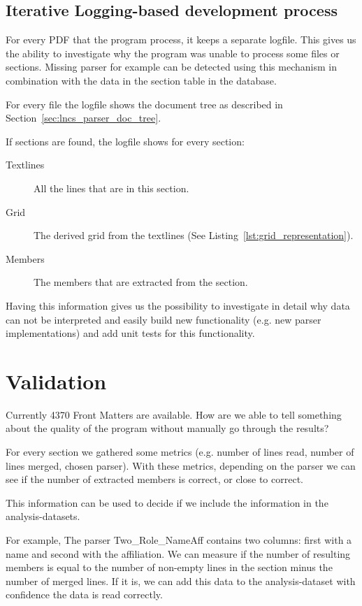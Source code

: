 \documentclass{ou-report}
\begin{document}
\subsection{Iterative Logging-based development process}
For every PDF that the program process, it keeps a separate logfile. This gives
us the ability to investigate why the program was unable to process some files 
or sections. Missing parser for example can be detected using this mechanism in
combination with the data in the section table in the database.

For every file the logfile shows the document tree as described in 
Section~\ref{sec:lncs_parser_doc_tree}. 

If sections are found, the logfile shows for every section:
\begin{description}
    \item[Textlines] All the lines that are in this section.
    \item[Grid] The derived grid from the textlines (See
        Listing~\ref{lst:grid_representation}).
    \item[Members] The members that are extracted from the section.
\end{description}
Having this information gives us the possibility to 
investigate in detail why data can not be interpreted and easily build new 
functionality (e.g. new parser implementations) and add unit tests for this 
functionality.

\section{Validation}
\label{sec:front_matter_validation}
Currently 4370 Front Matters are available. How are we able to tell something 
about the quality of the program without manually go through the results?

For every section we gathered some metrics (e.g. number of lines read, number of 
lines merged, chosen parser). With these metrics, depending 
on the parser we can see if the number of extracted members is correct, or close to
correct.

This information can be used to decide if we include the information in the
analysis-datasets.

For example, The parser Two\_Role\_NameAff contains two columns: first with a name
and second with the affiliation. We can measure if the number of resulting 
members is equal to the number of non-empty lines in the section minus the number 
of merged lines. If it is, we can add this data to the analysis-dataset with 
confidence the data is read correctly.
\end{document}
